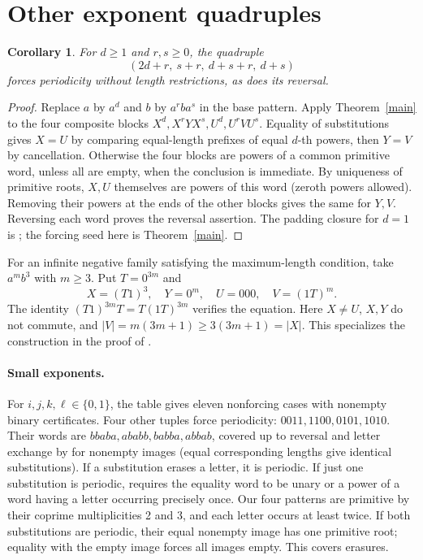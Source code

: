 \documentclass[11pt]{article}
\newtheorem{corollary}[theorem]{Corollary}
\theoremstyle{remark}\newtheorem*{remark}{Remark}
\begin{document}
\section{Other exponent quadruples}
\begin{corollary}
For \(d\ge1\) and \(r,s\ge0\), the quadruple
\[
 (2d+r,\ s+r,\ d+s+r,\ d+s)
\]
forces periodicity without length restrictions, as does its reversal.
\end{corollary}
\begin{proof}
Replace \(a\) by \(a^d\) and \(b\) by \(a^r b a^s\) in the base pattern. Apply Theorem~\ref{main} to the four composite blocks \(X^d,X^rYX^s,U^d,U^rVU^s\). Equality of substitutions gives \(X=U\) by comparing equal-length prefixes of equal \(d\)-th powers, then \(Y=V\) by cancellation. Otherwise the four blocks are powers of a common primitive word, unless all are empty, when the conclusion is immediate. By uniqueness of primitive roots, \(X,U\) themselves are powers of this word (zeroth powers allowed). Removing their powers at the ends of the other blocks gives the same for \(Y,V\). Reversing each word proves the reversal assertion. The padding closure for \(d=1\) is \cite[Lemma 26]{hs}; the forcing seed here is Theorem~\ref{main}.
\end{proof}
For an infinite negative family satisfying the maximum-length condition, take \(a^m b^3\) with \(m\ge3\). Put \(T=0^{3m}\) and
\[
 X=(T1)^3,\quad Y=0^m,\quad U=000,\quad V=(1T)^m .
\]
The identity \((T1)^{3m}T=T(1T)^{3m}\) verifies the equation. Here \(X\ne U\), \(X,Y\) do not commute, and \(|V|=m(3m+1)\ge 3(3m+1)=|X|\). This specializes the construction in the proof of \cite[Theorem 30]{hs}.

\paragraph{Small exponents.}
For \(i,j,k,\ell\in\{0,1\}\), the table gives eleven nonforcing cases with nonempty binary certificates. Four other tuples force periodicity: \(0011,1100,0101,1010\). Their words are \(bbaba,ababb,babba,abbab\), covered up to reversal and letter exchange by \cite[Lemmas 14--15]{hs} for nonempty images (equal corresponding lengths give identical substitutions). If a substitution erases a letter, it is periodic. If just one substitution is periodic, \cite[Theorem 1]{periodic} requires the equality word to be unary or a power of a word having a letter occurring precisely once. Our four patterns are primitive by their coprime multiplicities 2 and 3, and each letter occurs at least twice. If both substitutions are periodic, their equal nonempty image has one primitive root; equality with the empty image forces all images empty. This covers erasures.
\end{document}
